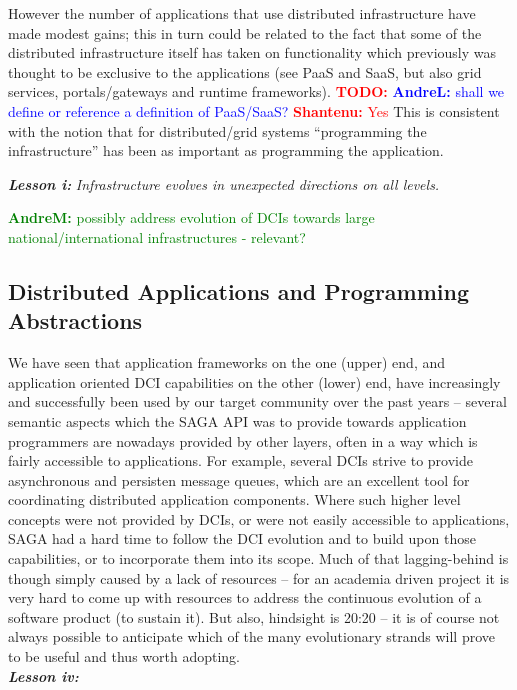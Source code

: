 \documentclass{article}
\newcommand{\I}[1]{\textit{#1}}
\newcommand{\B}[1]{\textbf{#1}}
\newcommand{\BI}[1]{\textbf{\textit{#1}}}
\newcommand{\todo}[1]{{\textcolor{red}{\B{TODO:} #1 }}}
\newcommand{\jhanote}[1]{{\textcolor{red}{     \B{Shantenu:} #1 }}}
\newcommand{\amnote}[1]{{\textcolor{green}{   \B{AndreM:  } #1 }}}
\newcommand{\alnote}[1]{{\textcolor{blue}{    \B{AndreL:  } #1 }}}
\newcommand{\todo}[1]{}
\newcommand{\jhanote}[1]{}
\newcommand{\amnote}[1]{}
\newcommand{\alnote}[1]{}
\begin{document}
  However the number of applications that use distributed infrastructure
  have made modest gains; this in turn could be related to the fact that
  some of the distributed infrastructure itself has taken on
  functionality which previously was thought to be exclusive to the
  applications (see PaaS and SaaS, but also grid services,
  portals/gateways and runtime frameworks). \todo{}\alnote{shall we
  define or reference a definition of PaaS/SaaS?}\jhanote{Yes} This is
  consistent with the notion that for distributed/grid systems
  ``programming the infrastructure'' has been as important as
  programming the application.

  \BI{Lesson i:} \I{Infrastructure evolves in unexpected directions  on all
  levels.}

  \amnote{possibly address evolution of DCIs towards large
  national/international infrastructures - relevant?}


 \subsection{Distributed Applications and Programming Abstractions}

  We have seen that application frameworks on the one (upper) end, and
  application oriented DCI capabilities on the other (lower) end, have
  increasingly and successfully been used by our target community over
  the past years -- several semantic aspects which the SAGA API was to
  provide towards application programmers are nowadays provided by other
  layers, often in a way which is fairly accessible to applications.
  For example, several DCIs strive to provide asynchronous and persisten
  message queues, which are an excellent tool for coordinating
  distributed application components.  Where such higher level concepts
  were not provided by DCIs, or were not easily accessible to
  applications, SAGA had a hard time to follow the DCI evolution and to
  build upon those capabilities, or to incorporate them into its scope.
  Much of that lagging-behind is though simply caused by a lack of
  resources -- for an academia driven project it is very hard to come up
  with resources to address the continuous evolution of a software
  product (to sustain it).  But also, hindsight is 20:20 -- it is of
  course not always possible to anticipate which of the many
  evolutionary strands will prove to be useful and thus worth
  adopting.\\
  \BI{Lesson iv:} 

\end{document}
